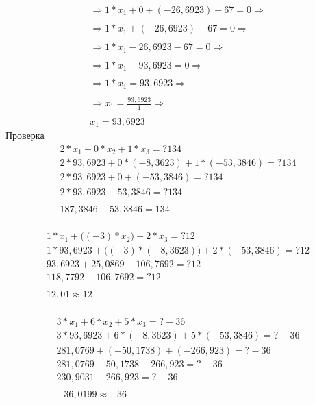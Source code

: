 \documentclass[12pt, a4paper]{article}
\begin{document}
\begin{enumerate}
{\begin{equation}
\begin{split}
						\Rightarrow1 * x_1 + 0 + (-26,6923) - 67 = 0\Rightarrow\\\\
						\Rightarrow1 * x_1 + (-26,6923) - 67 = 0\Rightarrow\\\\
						\Rightarrow1 * x_1 - 26,6923 - 67 = 0\Rightarrow\\\\
						\Rightarrow1 * x_1 - 93,6923 = 0\Rightarrow\\\\
						\Rightarrow1 * x_1 = 93,6923\Rightarrow\\\\
						\Rightarrow x_1 = \frac{93,6923}{1}\Rightarrow\\\\
						x_1 = 93,6923
					\end{split}
				\end{equation}\newpage
				Проверка\\
				\begin{equation}
					\begin{split}
						2 * x_1 + 0 * x_2 + 1 * x_3 =? 134\\
						2 * 93,6923 + 0 * (-8,3623) + 1 * (-53,3846) =? 134\\
						2 * 93,6923 + 0 + (-53,3846) =? 134\\
						2 * 93,6923 - 53,3846 =? 134\\\\
						187,3846 - 53,3846 = 134
					\end{split}
				\end{equation}\\
				\begin{equation}
					\begin{split}
						1 * x_1 + \bigl((-3) * x_2\bigr) + 2 * x_3 =? 12\\
						1 * 93,6923 + \bigl((-3) * (-8,3623)\bigr) + 2 * (-53,3846) =? 12\\
						93,6923 + 25,0869 - 106,7692 =? 12\\
						118,7792 - 106,7692 =? 12\\\\
						12,01\approx12
					\end{split}
				\end{equation}\\
				\begin{equation}
					\begin{split}
						3 * x_1 + 6 * x_2 + 5 * x_3 =? -36\\
						3 * 93,6923 + 6 * (-8,3623) + 5 * (-53,3846) =? -36\\
						281,0769 + (-50,1738) + (-266,923) =? -36\\
						281,0769 - 50,1738 - 266,923 =? -36\\
						230,9031 - 266,923 =? -36\\\\
						-36,0199\approx-36
					\end{split}
				\end{equation}\\
				
}
\end{enumerate}
\end{document}
